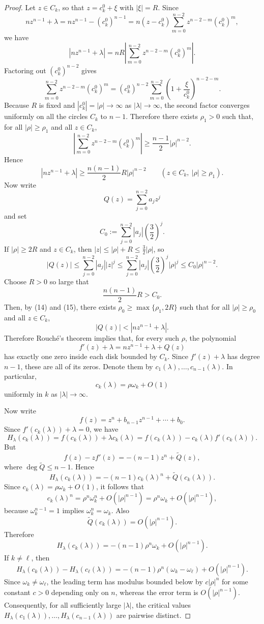 \documentclass[12pt]{amsart}
\theoremstyle{definition}
\theoremstyle{remark}
\begin{document}
\begin{proof}
\indent Let $z\in C_k$, so that $z=c_k^0+\xi$ with $|\xi|=R$. Since
\[
 nz^{n-1}+\lambda=nz^{n-1}-(c_k^0)^{n-1}=n(z-c_k^0)\sum_{m=0}^{n-2} z^{n-2-m}(c_k^0)^m,
\]
we have
\[
 |nz^{n-1}+\lambda|=nR\left|\sum_{m=0}^{n-2} z^{n-2-m}(c_k^0)^m\right|.
\]
Factoring out $(c_k^0)^{n-2}$ gives
\[
\sum_{m=0}^{n-2} z^{n-2-m}(c_k^0)^m=(c_k^0)^{n-2}\sum_{m=0}^{n-2}\left(1+\frac{\xi}{c_k^0}\right)^{n-2-m}.
\]
Because $R$ is fixed and $|c_k^0|=|\rho|\to\infty$ as $|\lambda|\to\infty$, the second factor converges uniformly on all the
circles $C_k$ to $n-1$. Therefore there exists $\rho_1>0$ such that, for all $|\rho|\ge \rho_1$ and all $z\in C_k$,
\[
\left|\sum_{m=0}^{n-2} z^{n-2-m}(c_k^0)^m\right|\ge \frac{n-1}{2}|\rho|^{n-2}.
\]
Hence
\begin{equation}
|nz^{n-1}+\lambda|\ge \frac{n(n-1)}{2}R|\rho|^{n-2}\qquad (z\in C_k,\ |\rho|\ge \rho_1).
\tag{14}
\end{equation}
Now write
\[
Q(z)=\sum_{j=0}^{n-2} a_j z^j
\]
and set
\[
 C_0:=\sum_{j=0}^{n-2}|a_j|\left(\frac32\right)^j.
\]
If $|\rho|\ge 2R$ and $z\in C_k$, then $|z|\le |\rho|+R\le \tfrac32|\rho|$, so
\begin{equation}
|Q(z)|\le \sum_{j=0}^{n-2}|a_j||z|^j\le \sum_{j=0}^{n-2}|a_j|\left(\frac32\right)^j |\rho|^j\le C_0 |\rho|^{n-2}.
\tag{15}
\end{equation}
Choose $R>0$ so large that
\[
\frac{n(n-1)}{2}R>C_0.
\]
Then, by (14) and (15), there exists $\rho_0\ge \max\{\rho_1,2R\}$ such that for all $|\rho|\ge \rho_0$ and all $z\in C_k$,
\[
 |Q(z)|<|nz^{n-1}+\lambda|.
\]
Therefore Rouch\'e's theorem implies that, for every such $\rho$, the polynomial
\[
 f'(z)+\lambda=nz^{n-1}+\lambda+Q(z)
\]
has exactly one zero inside each disk bounded by $C_k$. Since $f'(z)+\lambda$ has degree $n-1$, these are all
of its zeros. Denote them by $c_1(\lambda),\dots,c_{n-1}(\lambda)$. In particular,
\[
 c_k(\lambda)=\rho\omega_k+O(1)
\]
uniformly in $k$ as $|\lambda|\to\infty$.

\indent Now write
\[
 f(z)=z^n+b_{n-1}z^{n-1}+\cdots+b_0.
\]
Since $f'(c_k(\lambda))+\lambda=0$, we have
\[
H_\lambda(c_k(\lambda))=f(c_k(\lambda))+\lambda c_k(\lambda)=f(c_k(\lambda))-c_k(\lambda)f'(c_k(\lambda)).
\]
But
\[
 f(z)-zf'(z)=-(n-1)z^n+\widetilde Q(z),
\]
where $\deg \widetilde Q\le n-1$. Hence
\[
H_\lambda(c_k(\lambda))=-(n-1)c_k(\lambda)^n+\widetilde Q(c_k(\lambda)).
\]
Since $c_k(\lambda)=\rho\omega_k+O(1)$, it follows that
\[
 c_k(\lambda)^n=\rho^n\omega_k^n+O(|\rho|^{n-1})=\rho^n\omega_k+O(|\rho|^{n-1}),
\]
because $\omega_k^{n-1}=1$ implies $\omega_k^n=\omega_k$. Also
\[
 \widetilde Q(c_k(\lambda))=O(|\rho|^{n-1}).
\]
Therefore
\[
 H_\lambda(c_k(\lambda))=-(n-1)\rho^n\omega_k+O(|\rho|^{n-1}).
\]
If $k\neq \ell$, then
\[
 H_\lambda(c_k(\lambda))-H_\lambda(c_\ell(\lambda))=-(n-1)\rho^n(\omega_k-\omega_\ell)+O(|\rho|^{n-1}).
\]
Since $\omega_k\neq \omega_\ell$, the leading term has modulus bounded below by $c|\rho|^n$ for some constant $c>0$
depending only on $n$, whereas the error term is $O(|\rho|^{n-1})$. Consequently, for all sufficiently large
$|\lambda|$, the critical values $H_\lambda(c_1(\lambda)),\dots,H_\lambda(c_{n-1}(\lambda))$ are pairwise distinct.


\end{proof}
\end{document}
